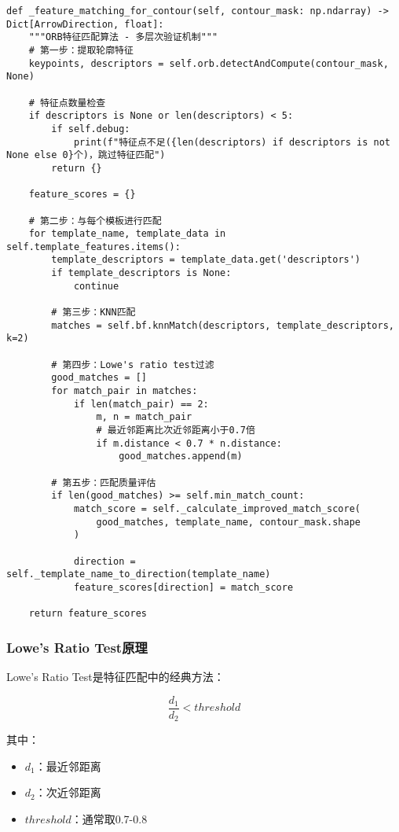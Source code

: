 \documentclass[12pt]{article}
\begin{document}
\begin{lstlisting}[caption=ORB特征匹配实现]
def _feature_matching_for_contour(self, contour_mask: np.ndarray) -> Dict[ArrowDirection, float]:
    """ORB特征匹配算法 - 多层次验证机制"""
    # 第一步：提取轮廓特征
    keypoints, descriptors = self.orb.detectAndCompute(contour_mask, None)
    
    # 特征点数量检查
    if descriptors is None or len(descriptors) < 5:
        if self.debug:
            print(f"特征点不足({len(descriptors) if descriptors is not None else 0}个)，跳过特征匹配")
        return {}
    
    feature_scores = {}
    
    # 第二步：与每个模板进行匹配
    for template_name, template_data in self.template_features.items():
        template_descriptors = template_data.get('descriptors')
        if template_descriptors is None:
            continue
            
        # 第三步：KNN匹配
        matches = self.bf.knnMatch(descriptors, template_descriptors, k=2)
        
        # 第四步：Lowe's ratio test过滤
        good_matches = []
        for match_pair in matches:
            if len(match_pair) == 2:
                m, n = match_pair
                # 最近邻距离比次近邻距离小于0.7倍
                if m.distance < 0.7 * n.distance:
                    good_matches.append(m)
        
        # 第五步：匹配质量评估
        if len(good_matches) >= self.min_match_count:
            match_score = self._calculate_improved_match_score(
                good_matches, template_name, contour_mask.shape
            )
            
            direction = self._template_name_to_direction(template_name)
            feature_scores[direction] = match_score
    
    return feature_scores
\end{lstlisting}

\subsubsection{Lowe's Ratio Test原理}

Lowe's Ratio Test是特征匹配中的经典方法：

\begin{equation}
\frac{d_1}{d_2} < threshold
\end{equation}

其中：
\begin{itemize}
    \item $d_1$：最近邻距离
    \item $d_2$：次近邻距离
    \item $threshold$：通常取0.7-0.8
\end{itemize}
\end{document}
